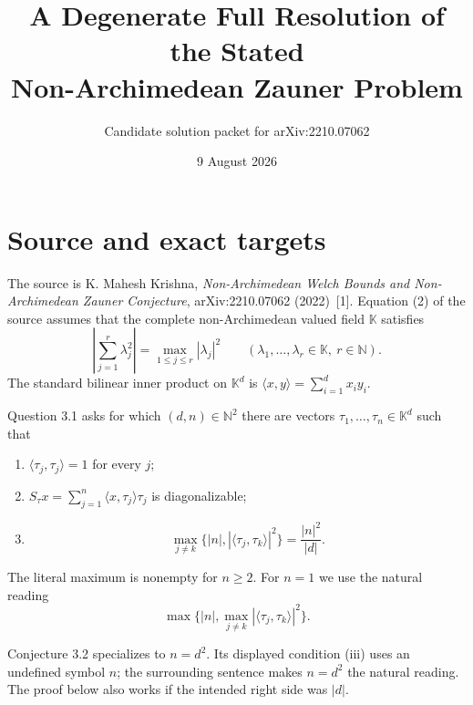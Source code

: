 \documentclass[11pt]{article}
\title{A Degenerate Full Resolution of the Stated\\
Non-Archimedean Zauner Problem}
\author{Candidate solution packet for arXiv:2210.07062}
\date{9 August 2026}
\newcommand{\K}{\mathbb K}
\newcommand{\N}{\mathbb N}
\begin{document}
\maketitle

\begin{center}
\end{center}

\section{Source and exact targets}

The source is K. Mahesh Krishna, \emph{Non-Archimedean Welch Bounds and
Non-Archimedean Zauner Conjecture}, arXiv:2210.07062 (2022)~[1].
Equation (2) of the source assumes that the complete non-Archimedean valued
field $\K$ satisfies
\begin{equation}\label{FU}
 \left|\sum_{j=1}^{r}\lambda_j^2\right|
 =\max_{1\le j\le r}|\lambda_j|^2
 \qquad(\lambda_1,\ldots,\lambda_r\in\K,\ r\in\N).
\end{equation}
The standard bilinear inner product on $\K^d$ is
$\langle x,y\rangle=\sum_{i=1}^d x_i y_i$.

Question 3.1 asks for which $(d,n)\in\N^2$ there are vectors
$\tau_1,\ldots,\tau_n\in\K^d$ such that
\begin{enumerate}[label=(\roman*)]
 \item $\langle\tau_j,\tau_j\rangle=1$ for every $j$;
 \item $S_\tau x=\sum_{j=1}^n\langle x,\tau_j\rangle\tau_j$ is diagonalizable;
 \item
 \begin{equation}\label{Q-equality}
 \max_{j\ne k}\bigl\{|n|,|\langle\tau_j,\tau_k\rangle|^2\bigr\}
 =\frac{|n|^2}{|d|}.
 \end{equation}
\end{enumerate}
The literal maximum is nonempty for $n\ge2$.  For $n=1$ we use the natural
reading
\[
 \max\bigl\{|n|,\max_{j\ne k}|\langle\tau_j,\tau_k\rangle|^2\bigr\}.
\]

Conjecture 3.2 specializes to $n=d^2$.  Its displayed condition (iii) uses an
undefined symbol $n$; the surrounding sentence makes $n=d^2$ the natural
reading.  The proof below also works if the intended right side was $|d|$.
\end{document}
